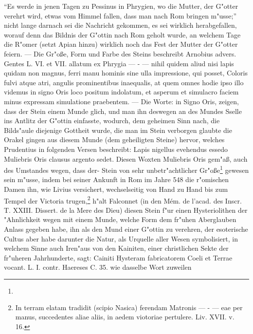 \documentclass[a4paper, 11pt, oneside, polutonikogreek, german]{article}
\begin{document}
"`Es werde in jenen Tagen zu Pessinus in Phrygien, wo die Mutter, der G"otter verehrt wird, etwas vom Himmel fallen, dass man nach Rom bringen m"usse;"' nicht lange darnach sei die Nachricht gekommen, es sei wirklich herabgefallen, worauf denn das Bildnis der G"ottin nach Rom geholt wurde, an welchem Tage die R"omer (setzt Apian hinzu) wirklich noch das Fest der Mutter der G"otter feiern. --- Die Gr"oße, Form und Farbe des Steins beschreibt Arnobius advers. Gentes L. VI. et VII. allatum ex Phrygia --- - --- nihil quidem aliud nisi lapis quidam non magnus, ferri manu hominis sine ulla impressione, qui posset, Coloris fulvi atque atri, angulis prominentibus inaequalis, at quem omnes hodie ipso illo videmus in signo Oris loco positum indolatum, et asperum et simulacro faciem minus expressam simulatione praebentem. --- Die Worte: in Signo Oris, zeigen, dass der Stein einem Munde glich, und man ihn deswegen an des Mundes Sselle ins Antlitz der G"ottin einfasste, wodurch, dem geheimen Sinn nach, die Bilds"aule diejenige Gottheit wurde, die man im Stein verborgen glaubte die Orakel gingen aus diesem Munde (dem geheiligten Steine) hervor, welches Prudentius in folgenden Versen beschreibt: Lapis nigellus evehendus essedo Muliebris Oris clausus argento sedet. Diesen Woxten Muliebris Oris gem"aß, auch des Umstandes wegen, dass der- Stein von sehr unbetr"achtlicher Gr"oße\footnote{} gewesen sein m"usse, indem bei seiner Ankunft in Rom im Jahre 548 die r"omischen Damen ihn, wie Livius versichert, wechselseitig von Hand zu Hand bis zum Tempel der Victoria trugen,\footnote{In terram elatam tradidit (scipio Nasica) ferendam Matronis --- - --- eae per manus, succedentes aliae aliis, in aedem viotoriae pertulere. Liv. XVII. v. 16.} h"alt Falconnet (in den Mém. de l'acad. des Inscr. T. XXIII. Dissert. de la Mere des Dieu) diesen Stein f"ur einen Hysteriolithen der "Ahnlichkeit wegen mit einem Munde, welche Form dem fr"uhen Aberglauben Anlass gegeben habe, ihn als den Mund einer G"ottin zu verehren, der esoterische Cultus aber habe darunter die Natur, als Urquelle aller Wesen symbolisiert, in welchem Sinne auch Iren"aus von den Kainiten, einer christlichen Sekte der fr"uheren Jahrhunderte, sagt: Cainiti Hysteram fabricatorem Coeli et Terrae vocant. L. I. contr. Haereses C. 35. wie dasselbe Wort zuweilen 
\end{document}
